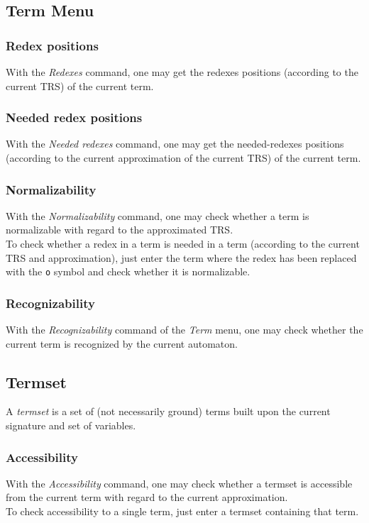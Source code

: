 \documentclass[11pt]{llncs}
\def\autocom#1{\textsl{#1 }}
\begin{document}
\subsection{Term Menu}

\subsubsection{Redex positions}
With the \autocom{Redexes} command, one may get the redexes positions
(according to the current TRS) of the current term.

\subsubsection{Needed redex positions}
With the \autocom{Needed redexes} command, one may get the needed-redexes 
positions
(according to the current approximation of the current TRS) of the current 
term.

\subsubsection{Normalizability}
With the \autocom{Normalizability} command, one may check whether a term
is normalizable with regard to the approximated TRS.\\
To check whether a redex in a term is needed in a term (according
to the current TRS and approximation), just enter the term where the
redex has been replaced with the {\tt o} symbol and check whether
it is normalizable.

\subsubsection{Recognizability}
With the \autocom{Recognizability} command of the \autocom{Term} menu, 
one may check whether the current
term is recognized by the current automaton.

\subsection{Termset}
A \emph{termset} is a set of (not necessarily ground) terms built upon
the current signature and set of variables.

\subsubsection{Accessibility}
With the \autocom{Accessibility} command, one may check whether a termset
is accessible from the current term with regard to the current
approximation.\\
To check accessibility to a single term, just enter a termset containing
that term.
\end{document}

